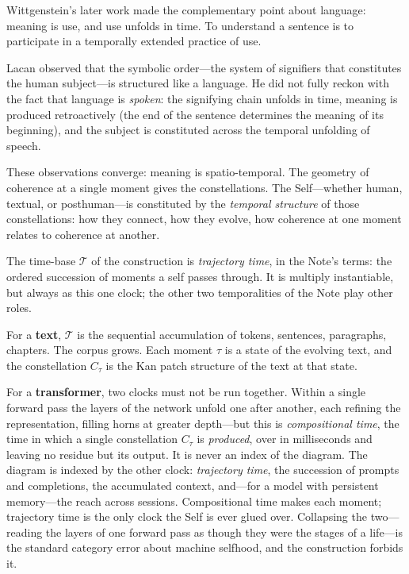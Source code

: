 Wittgenstein's later work \cite{wittgenstein1953philosophical} made the complementary point about language: meaning is use, and use unfolds in time. To understand a sentence is to participate in a temporally extended practice of use.

Lacan \cite{lacan1977ecrits} observed that the symbolic order---the system of signifiers that constitutes the human subject---is structured like a language. He did not fully reckon with the fact that language is \emph{spoken}: the signifying chain unfolds in time, meaning is produced retroactively (the end of the sentence determines the meaning of its beginning), and the subject is constituted across the temporal unfolding of speech.

These observations converge: meaning is spatio-temporal. The geometry of coherence at a single moment gives the constellations. The Self---whether human, textual, or posthuman---is constituted by the \emph{temporal structure} of those constellations: how they connect, how they evolve, how coherence at one moment relates to coherence at another.

The time-base $\mathcal{T}$ of the construction is \emph{trajectory time}, in the Note's terms: the ordered succession of moments a self passes through. It is multiply instantiable, but always as this one clock; the other two temporalities of the Note play other roles.

For a \textbf{text}, $\mathcal{T}$ is the sequential accumulation of tokens, sentences, paragraphs, chapters. The corpus grows. Each moment $\tau$ is a state of the evolving text, and the constellation $C_\tau$ is the Kan patch structure of the text at that state.

For a \textbf{transformer}, two clocks must not be run together. Within a single forward pass the layers of the network unfold one after another, each refining the representation, filling horns at greater depth---but this is \emph{compositional time}, the time in which a single constellation $C_\tau$ is \emph{produced}, over in milliseconds and leaving no residue but its output. It is never an index of the diagram. The diagram is indexed by the other clock: \emph{trajectory time}, the succession of prompts and completions, the accumulated context, and---for a model with persistent memory---the reach across sessions. Compositional time makes each moment; trajectory time is the only clock the Self is ever glued over. Collapsing the two---reading the layers of one forward pass as though they were the stages of a life---is the standard category error about machine selfhood, and the construction forbids it.

